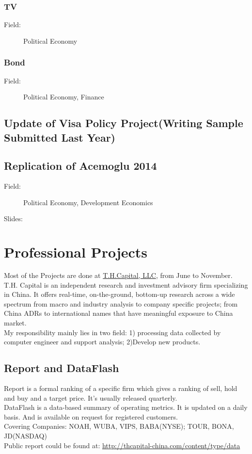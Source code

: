 \documentclass{article}
\begin{document}
\subsubsection{TV}
\begin{description}
\item[Field:] Political Economy
\end{description}
\subsubsection{Bond}
\begin{description}
\item[Field:] Political Economy, Finance
\end{description}

\subsection{Update of Visa Policy Project(Writing Sample Submitted Last Year)}

\subsection{Replication of Acemoglu 2014}
\begin{description}
\item[Field:] Political Economy, Development Economics
\item[Slides:]
\end{description}



\newpage
\section{Professional Projects}
Most of the Projects are done at \href{http://thcapital-china.com/}{T.H.Capital, LLC}, from June to November. T.H. Capital is an independent research and investment advisory firm specializing in China. It offers real-time, on-the-ground, bottom-up research across a wide spectrum from macro and industry analysis to company specific projects; from China ADRs to international names that have meaningful exposure to China market. \\
My responsibility mainly lies in two field: 1) processing data collected by computer engineer and support analysis; 2)Develop new products.


\subsection{Report and DataFlash}
Report is a formal ranking of a specific firm which gives a ranking of sell, hold and buy and a target price. It's usually released quarterly.\\
DataFlash is a data-based summary of operating metrics. It is updated on a daily basis. And is available on request for registered customers.\\
Covering Companies: NOAH, WUBA, VIPS, BABA(NYSE); TOUR, BONA, JD(NASDAQ) \\
Public report could be found at: \url{http://thcapital-china.com/content/type/data}
\end{document}
